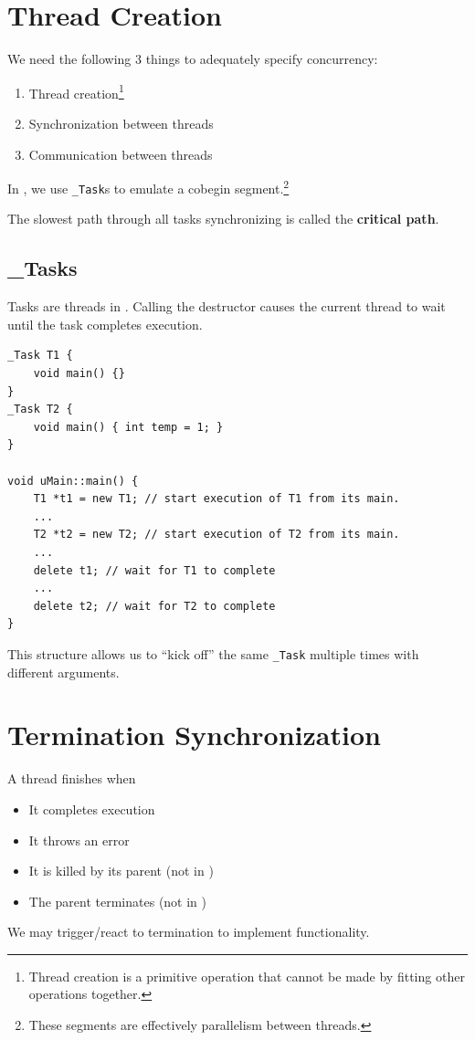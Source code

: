         \section{Thread Creation} %
        \label{sec:thread_creation}
            We need the following 3 things to adequately specify concurrency:
            \begin{enumerate}
                \item Thread creation\footnote{Thread creation is a primitive operation that cannot be made by fitting other operations together.}
                \item Synchronization between threads
                \item Communication between threads
            \end{enumerate}
            In \uC, we use \verb|_Task|s to emulate a cobegin segment.\footnote{These segments are effectively parallelism between threads.}

            The slowest path through all tasks synchronizing is called the \textbf{critical path}.
            \subsection{\uC \_Tasks} %
            \label{sub:uc__tasks}
                Tasks are threads in \uC.
                Calling the destructor causes the current thread to wait until the task completes execution.

                \begin{lstlisting}
_Task T1 {
    void main() {}
}
_Task T2 {
    void main() { int temp = 1; }
}

void uMain::main() {
    T1 *t1 = new T1; // start execution of T1 from its main.
    ...
    T2 *t2 = new T2; // start execution of T2 from its main.
    ...
    delete t1; // wait for T1 to complete
    ...
    delete t2; // wait for T2 to complete
}
                \end{lstlisting}
                This structure allows us to ``kick off'' the same \verb|_Task| multiple times with different arguments.
        \section{Termination Synchronization} %
        \label{sec:termination_synchronization}
            A thread finishes when
            \begin{itemize}
                \item It completes execution
                \item It throws an error
                \item It is killed by its parent (not in \uC)
                \item The parent terminates (not in \uC)
            \end{itemize}
            We may trigger/react to termination to implement functionality.
